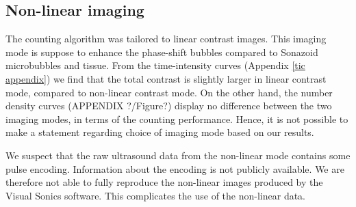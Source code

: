 \subsection{Non-linear imaging}
The counting algorithm was tailored to linear contrast images. This imaging mode is suppose to enhance the phase-shift bubbles compared to Sonazoid\texttrademark{} microbubbles and tissue. From the time-intensity curves (Appendix \ref{tic appendix}) we find that the total contrast is slightly larger in linear contrast mode, compared to non-linear contrast mode. On the other hand, the number density curves (APPENDIX ?/Figure?) display no difference between the two imaging modes, in terms of the counting performance. Hence, it is not possible to make a statement regarding choice of imaging mode based on our results.

We suspect that the raw ultrasound data from the non-linear mode contains some pulse encoding. Information about the encoding is not publicly available. We are therefore not able to fully reproduce the non-linear images produced by the Visual Sonics software. This complicates the use of the non-linear data.  





%
%

